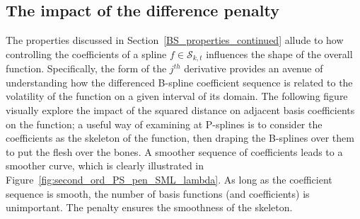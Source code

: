 \documentclass[12pt]{article}
\theoremstyle{definition}
\begin{document}

\subsection{The impact of the difference penalty}

The properties discussed in Section~\ref{BS_properties_continued} allude to how controlling the coefficients of a spline $f \in \mathscr{S}_{k,t}$ influences the shape of the overall function. Specifically, the form of the $j^{th}$ derivative provides an avenue of understanding how the differenced B-spline coefficient sequence is related to the volatility of the function on a given interval of its domain. The following figure visually explore the impact of the squared distance on adjacent basis coefficients on the function; a useful way of examining at P-splines is to consider the coefficients as the skeleton of the function, then draping the B-splines over them to put the flesh over the bones. A smoother sequence of coefficients leads to a smoother curve, which is clearly illustrated in Figure~\ref{fig:second_ord_PS_pen_SML_lambda}. As long as the coefficient sequence is smooth, the number of basis functions (and coefficients) is unimportant. The penalty ensures the smoothness of the skeleton.
\end{document}
